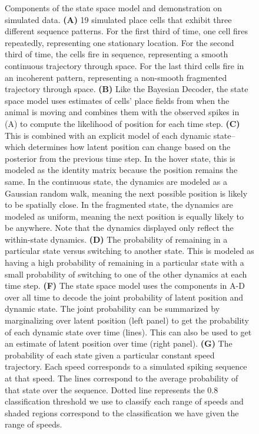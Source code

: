 \documentclass[times, twoside]{zHenriquesLab-StyleBioRxiv}
\begin{document}
\begin{figure}
\caption{Components of the state space model and demonstration on simulated data. \textbf{(A)} 19 simulated place cells that exhibit three different sequence patterns. For the first third of time, one cell fires repeatedly, representing one stationary location. For the second third of time, the cells fire in sequence, representing a smooth continuous trajectory through space. For the last third cells fire in an incoherent pattern, representing a non-smooth fragmented trajectory through space. \textbf{(B)} Like the Bayesian Decoder, the state space model uses estimates of cells' place fields from when the animal is moving and combines them with the observed spikes in (A) to compute the likelihood of position for each time step. \textbf{(C)} This is combined with an explicit model of each dynamic state--which determines how latent position can change based on the posterior from the previous time step. In the hover state, this is modeled as the identity matrix because the position remains the same. In the continuous state, the dynamics are modeled as a Gaussian random walk, meaning the next possible position is likely to be spatially close. In the fragmented state, the dynamics are modeled as uniform, meaning the next position is equally likely to be anywhere. Note that the dynamics displayed only reflect the within-state dynamics. \textbf{(D)} The probability of remaining in a particular state versus switching to another state. This is modeled as having a high probability of remaining in a particular state with a small probability of switching to one of the other dynamics at each time step. \textbf{(F)} The state space model uses the components in A-D over all time to decode the joint probability of latent position and dynamic state. The joint probability can be summarized by marginalizing over latent position (left panel) to get the probability of each dynamic state over time (lines). This can also be used to get an estimate of latent position over time (right panel). \textbf{(G)} The probability of each state given a particular constant speed trajectory. Each speed corresponds to a simulated spiking sequence at that speed. The lines correspond to the average probability of that state over the sequence. Dotted line represents the 0.8 classification threshold we use to classify each range of speeds and shaded regions correspond to the classification we have given the range of speeds.
}
\label{1}
\end{figure}
\end{document}
